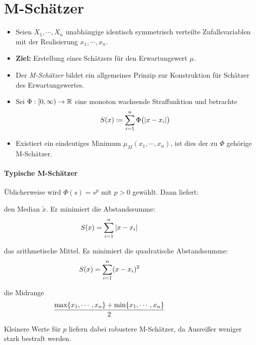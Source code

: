     \section{M-Schätzer}
        \begin{itemize}
        	\item Seien \( X_1, \cdots, X_n \) unabhängige identisch symmetrisch verteilte Zufallsvariablen mit der Realisierung \(x_1, \cdots, x_n\).
        	\item \textbf{Ziel:} Erstellung eines Schätzers für den Erwartungswert \(\mu\).
	        \item Der \textit{M-Schätzer} bildet ein allgemeines Prinzip zur Konstruktion für Schätzer des Erwartungswertes.
	        \item Sei \( \Phi : [0, \infty) \rightarrow \mathbb{R} \) eine monoton wachsende Straffunktion und betrachte
		        \begin{equation*}
			        S(x) \coloneqq \sum_{i = 1}^{n} \Phi\big( \abs{x - x_i} \big)
		        \end{equation*}
		    \item Existiert ein eindeutiges Minimum \( \mu_M(x_1, \cdots, x_n) \), ist dies der zu \(\Phi\) gehörige M-Schätzer.
        \end{itemize}
    
        \paragraph{Typische M-Schätzer}
	        Üblicherweise wird \( \Phi(s) = s^p \) mit \( p > 0 \) gewählt. Dann liefert:
	        \begin{description}[leftmargin = 2cm]
	        	\item[\( p = 1\)] den Median \( \tilde{x} \). Er minimiert die Abstandssumme:
		        	\begin{equation*}
			        	\hspace{-2cm} S(x) = \sum_{i = 1}^{n} \abs{x - x_i}
		        	\end{equation*}
		        \item[\( p = 2 \)] das arithmetische Mittel. Es minimiert die quadratische Abstandssumme:
			        \begin{equation*}
				        \hspace{-2cm} S(x) = \sum_{i = 1}^{n} (x - x_i)^2
			        \end{equation*}
			    \item[\( p \rightarrow \infty \)] die Midrange
				    \begin{equation*}
					    \hspace{-2cm} \frac{\max \{ x_1, \cdots, x_n \} + \min \{ x_1, \cdots, x_n \}}{2}
				    \end{equation*}
	        \end{description}
	        Kleinere Werte für \(p\) liefern dabei robustere M-Schätzer, da Ausreißer weniger stark bestraft werden.
	        
